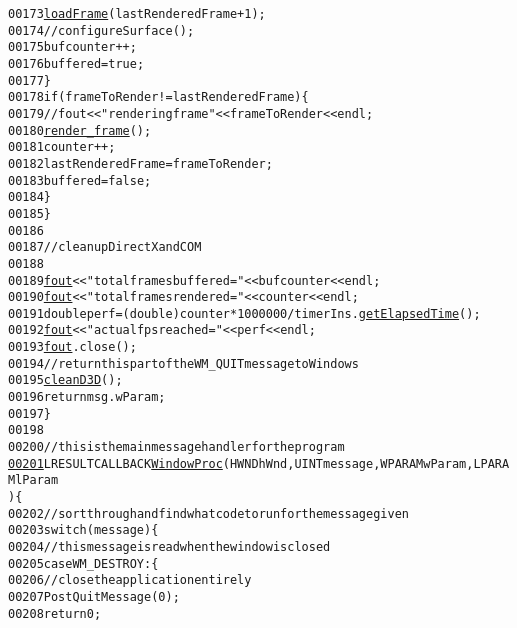 \begin{footnotesize}
\begin{alltt}
00173                         \hyperlink{main_8cpp_a117a4ee6ce2172cb8d6b4ac48a6c3645}{loadFrame}(lastRenderedFrame+1);
00174                         \textcolor{comment}{//configureSurface();}
00175                         bufcounter++;
00176                         buffered=\textcolor{keyword}{true};
00177                 \}
00178                 \textcolor{keywordflow}{if}(frameToRender!=lastRenderedFrame) \{
00179                         \textcolor{comment}{//fout<<"rendering frame "<<frameToRender<<endl;}
00180                         \hyperlink{main_8cpp_a9d208c9398ed462c31771146011c45a6}{render_frame}();
00181                         counter++;
00182                         lastRenderedFrame = frameToRender;
00183                         buffered = \textcolor{keyword}{false};
00184                 \}
00185         \}
00186 
00187         \textcolor{comment}{// clean up DirectX and COM}
00188 
00189         \hyperlink{config_8h_a0a2814a2252fee90794304506ef2e9c0}{fout}<< \textcolor{stringliteral}{"total frames buffered = "}<<bufcounter<<endl;
00190         \hyperlink{config_8h_a0a2814a2252fee90794304506ef2e9c0}{fout}<< \textcolor{stringliteral}{"total frames rendered = "}<<counter<<endl;
00191         \textcolor{keywordtype}{double} perf = (double)counter * 1000000/ timerIns.\hyperlink{class_my_timer_abd0f6728cf64f7b5d81235588bb8e3c2}{getElapsedTime}();
00192         \hyperlink{config_8h_a0a2814a2252fee90794304506ef2e9c0}{fout} << \textcolor{stringliteral}{"actual fps reached = "}<< perf << endl;
00193         \hyperlink{config_8h_a0a2814a2252fee90794304506ef2e9c0}{fout}.close();
00194         \textcolor{comment}{// return this part of the WM\_QUIT message to Windows}
00195         \hyperlink{main_8cpp_a6e0493c83a486408dbfaae7812e6e47a}{cleanD3D}();
00196         \textcolor{keywordflow}{return} msg.wParam;
00197 \}
00198 
00200 \textcolor{comment}{// this is the main message handler for the program}
\hypertarget{main_8cpp_source_l00201}{}\hyperlink{main_8cpp_a3481ed5b54326a7e5b2562195ee71a58}{00201} LRESULT CALLBACK \hyperlink{main_8cpp_a3481ed5b54326a7e5b2562195ee71a58}{WindowProc}(HWND hWnd, UINT message, WPARAM wParam, LPARAM lParam
      ) \{
00202         \textcolor{comment}{// sort through and find what code to run for the message given}
00203         \textcolor{keywordflow}{switch}(message) \{
00204                 \textcolor{comment}{// this message is read when the window is closed}
00205 \textcolor{keywordflow}{case} WM\_DESTROY: \{
00206         \textcolor{comment}{// close the application entirely}
00207         PostQuitMessage(0);
00208         \textcolor{keywordflow}{return} 0;

\end{alltt}
\end{footnotesize}
